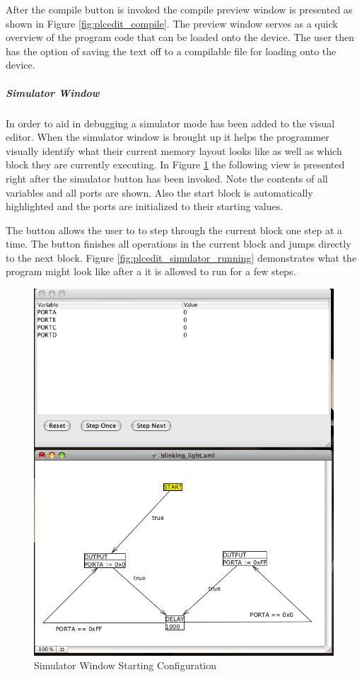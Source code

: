 After the compile button is invoked the compile preview window is presented as shown in Figure \ref{fig:plcedit_compile}. The preview window serves as a quick overview of the program code that can be loaded onto the device. The user then has the option of saving the text off to a compilable file for loading onto the device.

\subparagraph{Simulator Window}

In order to aid in debugging a simulator mode has been added to the visual editor. When the simulator window is brought up it helps the programmer visually identify what their current memory layout looks like as well as which block they are currently executing. In Figure \ref{fig:plcedit_simulator_start} the following view is presented right after the simulator button has been invoked. Note the contents of all variables and all ports are shown. Also the start block is automatically highlighted and the ports are initialized to their starting values.

The  button allows the user to to step through the current block one step at a time. The  button finishes all operations in the current block and jumps directly to the next block. Figure \ref{fig:plcedit_simulator_running} demonstrates what the program might look like after a it is allowed to run for a few steps.

\begin{figure}[htp]
    \centering
    \includegraphics[width=\imgmedium]{./images/plcedit_simulator_start.png}
    \caption{Simulator Window Starting Configuration}
    \label{fig:plcedit_simulator_start}
\end{figure}



